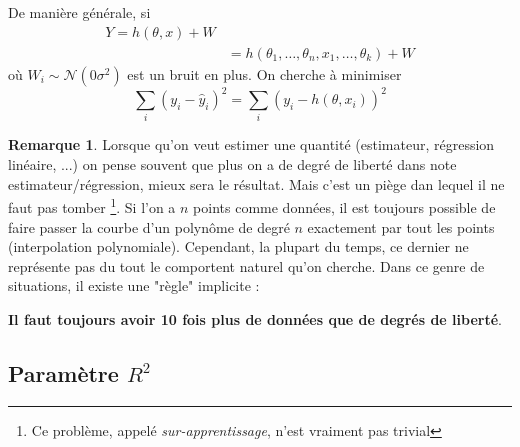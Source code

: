 \documentclass[a4paper,12pt]{report}
\theoremstyle{definition}
\renewcommand{\(}{\left(}
\renewcommand{\)}{\right)}
\renewcommand{\b}{\textbf}
\renewcommand{\d}{\textit}
\newtheorem{rmk}[thm]{Remarque}
\begin{document}
            De manière générale, si
            \begin{align*}
                Y = h(\theta,x) + W \\
                &= h(\theta_1,\dots,\theta_n,x_1,\dots,\theta_k) + W
            \end{align*}
            où $W_i\sim\mathcal{N}(0\sigma^2)$ est un bruit en plus. On cherche à minimiser
            $$\sum_i (y_i-\hat{y}_i)^2 = \sum_i (y_i-h(\theta,x_i))^2$$
            
            \begin{rmk}
                Lorsque qu'on veut estimer une quantité (estimateur, régression linéaire, ...) on pense souvent que plus on a de degré de liberté dans note estimateur/régression, mieux sera le résultat. Mais c'est un piège dan lequel il ne faut pas tomber \footnote{Ce problème, appelé \d{sur-apprentissage}, n'est vraiment pas trivial}. Si l'on a $n$ points comme données, il est toujours possible de faire passer la courbe d'un polynôme de degré $n$ exactement par tout les points (interpolation polynomiale). Cependant, la plupart du temps, ce dernier ne représente pas du tout le comportent naturel qu'on cherche. Dans ce genre de situations, il existe une "règle" implicite : \begin{center}\b{Il faut toujours avoir 10 fois plus de données que de degrés de liberté}.\end{center}
            \end{rmk}
            
        \subsection{Paramètre $R^2$}
        
\end{document}
